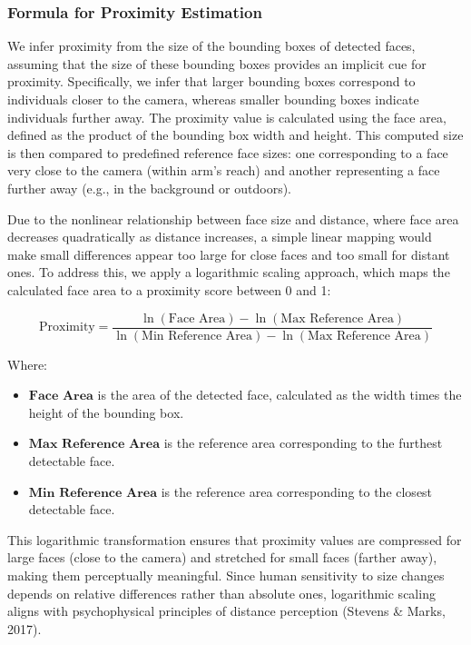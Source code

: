 \documentclass[
  man,floatsintext]{apa6}
\providecommand{\tightlist}{%
  \setlength{\itemsep}{0pt}\setlength{\parskip}{0pt}}
\begin{document}
\subsubsection{Formula for Proximity Estimation}\label{formula-for-proximity-estimation}

We infer proximity from the size of the bounding boxes of detected faces, assuming that the size of these bounding boxes provides an implicit cue for proximity. Specifically, we infer that larger bounding boxes correspond to individuals closer to the camera, whereas smaller bounding boxes indicate individuals further away. The proximity value is calculated using the face area, defined as the product of the bounding box width and height. This computed size is then compared to predefined reference face sizes: one corresponding to a face very close to the camera (within arm's reach) and another representing a face further away (e.g., in the background or outdoors).

Due to the nonlinear relationship between face size and distance, where face area decreases quadratically as distance increases, a simple linear mapping would make small differences appear too large for close faces and too small for distant ones. To address this, we apply a logarithmic scaling approach, which maps the calculated face area to a proximity score between 0 and 1:

\[
\text{Proximity} = \frac{\ln(\text{Face Area}) - \ln(\text{Max Reference Area})}{\ln(\text{Min Reference Area}) - \ln(\text{Max Reference Area})}
\]

Where:

\begin{itemize}
\tightlist
\item
  \(\textbf{Face Area}\) is the area of the detected face, calculated as the width times the height of the bounding box.
\item
  \(\textbf{Max Reference Area}\) is the reference area corresponding to the furthest detectable face.
\item
  \(\textbf{Min Reference Area}\) is the reference area corresponding to the closest detectable face.
\end{itemize}

This logarithmic transformation ensures that proximity values are compressed for large faces (close to the camera) and stretched for small faces (farther away), making them perceptually meaningful. Since human sensitivity to size changes depends on relative differences rather than absolute ones, logarithmic scaling aligns with psychophysical principles of distance perception (Stevens \& Marks, 2017).
\end{document}
